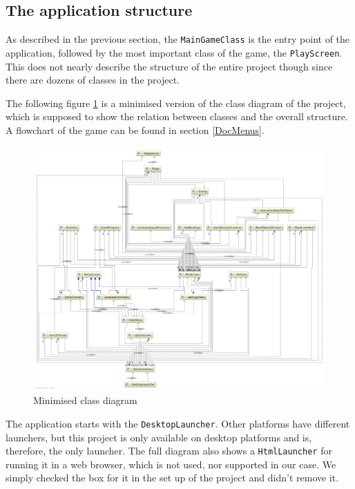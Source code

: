 \documentclass[12p]{article}
\begin{document}

\newpage
\subsection{The application structure} \label{DocApplicationStructure}

As described in the previous section, the \texttt{MainGameClass} is the entry point of the application, followed by the most important class of the game, the \texttt{PlayScreen}. This does not nearly describe the structure of the entire project though since there are dozens of classes in the project.

The following figure \ref{fig:minClassDiagram} is a minimised version of the class diagram of the project, which is supposed to show the relation between classes and the overall structure. A flowchart of the game can be found in section \ref{DocMenus}.

\begin{figure}[ht]
 \centering
 \includegraphics[width=1\textwidth]{Documentation/class_diagram_minimized.png}
 \caption{Minimised class diagram}
 \label{fig:minClassDiagram}
\end{figure}

The application starts with the \texttt{DesktopLauncher}. Other platforms have different launchers, but this project is only available on desktop platforms and is, therefore, the only launcher. The full diagram also shows a \texttt{HtmlLauncher} for running it in a web browser, which is not used, nor supported in our case. We simply checked the box for it in the set up of the project and didn't remove it.
\end{document}
